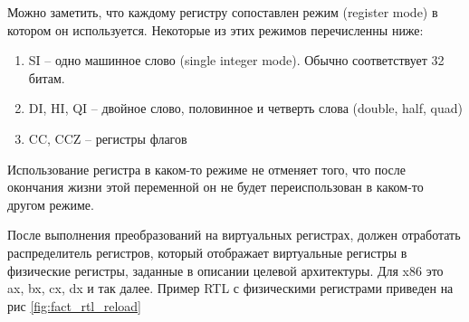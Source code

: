 \documentclass[a4paper,12pt,oneside]{article}
\begin{document}
Можно заметить, что каждому регистру сопоставлен режим (register mode) в котором он используется. Некоторые из этих режимов перечисленны ниже:

\begin{enumerate}
\item SI -- одно машинное слово (single integer mode). Обычно соответствует 32 битам.
\item DI, HI, QI -- двойное слово, половинное и четверть слова (double, half, quad)
\item CC, CCZ -- регистры флагов
\end{enumerate}

Использование регистра в каком-то режиме не отменяет того, что после окончания жизни этой переменной он не будет переиспользован в каком-то другом режиме.

После выполнения преобразований на виртуальных регистрах, должен отработать распределитель регистров, который отображает виртуальные регистры в физические регистры, заданные в описании целевой архитектуры. Для x86 это ax, bx, cx, dx и так далее. Пример RTL с физическими регистрами приведен на рис \ref{fig:fact_rtl_reload}
\end{document}
